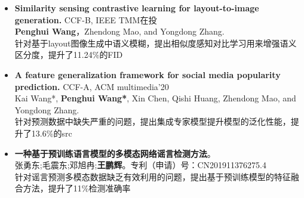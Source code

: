 \documentclass[zh]{resume}
\begin{document}
\begin{itemize}
  \item \textbf{Similarity sensing contrastive learning for layout-to-image generation.} CCF-B, IEEE TMM在投\\
  \textbf{Penghui Wang}，Zhendong Mao, and Yongdong Zhang.\\
  针对基于layout图像生成中语义模糊，提出相似度感知对比学习用来增强语义区分度，提升了11.24$\%$的FID
  \item \textbf{A feature generalization framework for social media popularity prediction.} CCF-A, ACM multimedia'20\\
  Kai Wang*, \textbf{Penghui Wang*}, Xin Chen, Qishi Huang, Zhendong Mao, and Yongdong Zhang.\\
  针对预测数据中缺失严重的问题，提出集成专家模型提升模型的泛化性能，提升了13.6$\%$的src
  \item \textbf{一种基于预训练语言模型的多模态网络谣言检测方法}。\\
  张勇东;毛震东;邓旭冉;\textbf{王鹏辉}。专利（申请）号：CN201911376275.4\\
  针对谣言预测多模态数据缺乏有效利用的问题，提出基于预训练模型的特征融合方法，提升了11$\%$检测准确率

\end{itemize}


\end{document}

